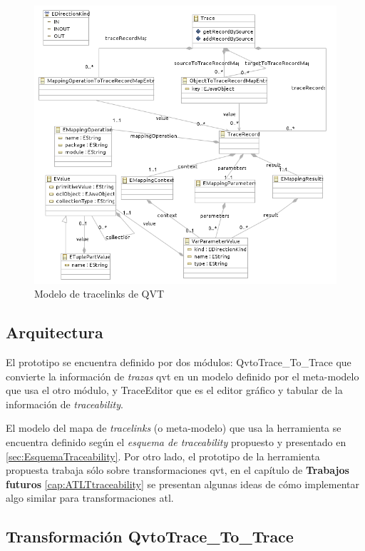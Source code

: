 \documentclass[a4paper,12pt,oneside,spanish]{book}
\begin{document}
\begin{figure}[hbtp]
\centering
\includegraphics[scale=0.78]{./img/QVTTraceModel}
\caption{Modelo de tracelinks de QVT}
\label{fig:QVTTraceModel}
\end{figure}



\subsection{Arquitectura}


El prototipo se encuentra definido por dos módulos: \textsf{QvtoTrace\_To\_Trace} que convierte la información de \textit{trazas} \gls{qvt} en un modelo definido por el meta-modelo que usa el otro módulo, y \textsf{TraceEditor} que es el editor gráfico y tabular de la información de \textit{traceability}.

El modelo del mapa de \textit{tracelinks} (o meta-modelo) que usa la herramienta se encuentra definido según el \textit{esquema de traceability} propuesto y presentado en \ref{sec:EsquemaTraceability}. Por otro lado, el prototipo de la herramienta propuesta trabaja sólo sobre transformaciones \gls{qvt}, en el capítulo de \textbf{Trabajos futuros} \ref{cap:ATLTtraceability} se presentan algunas ideas de cómo implementar algo similar para transformaciones \gls{atl}.



\subsection{Transformación QvtoTrace{\_}To{\_}Trace}
\end{document}

